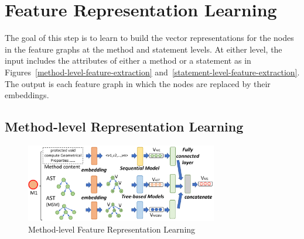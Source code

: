 \section{Feature Representation Learning}
\label{feature-learning:sec}

The goal of this step is to learn to build the vector representations
for the nodes in the feature graphs at the method and statement levels.
At either level, the input includes the attributes of either a method
or a statement as in Figures~\ref{method-level-feature-extraction}
and~\ref{statement-level-feature-extraction}. The output is each
feature graph in which the nodes are replaced by their embeddings.



\subsection{Method-level Representation Learning}

\begin{figure}[t]
	\centering
	\includegraphics[width=3.3in]{graphs/step-2-method-new.png}
        \vspace{-8pt}
	\caption{Method-level Feature Representation Learning}
	\label{method-level-feature-learning}
\end{figure}




